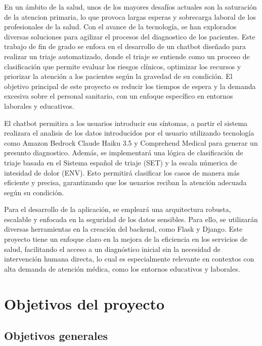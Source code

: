 
En un ámbito de la salud, unos de los mayores desafíos actuales son la saturación de la atencion primaria, lo que provoca largas esperas y sobrecarga laboral de los profesionales de la salud. Con el avance de la tecnología, se han explorados diversas soluciones para agilizar el procesos del diagnostico de los pacientes. Este trabajo de fin de grado se enfoca en el desarrollo de un chatbot diseñado para realizar un triaje automatizado, donde el triaje se entiende como un proceso de clasificación que permite evaluar los riesgos clínicos, optimizar los recursos y priorizar la atención a los pacientes según la gravedad de su condición. El objetivo principal de este proyecto es reducir los tiempos de espera y la demanda excesiva sobre el personal sanitario, con un enfoque específico en entornos laborales y educativos.

El chatbot permitira a los usuarios introducir sus síntomas, a partir el sistema realizara el analisis de los datos introducidos por el usuario utilizando tecnología como Amazon Bedrock Claude Haiku 3.5 y Comprehend Medical para generar un presunto diagnostico. Además, se implementará una lógica de clasificación de triaje basada en el Sistema español de triaje (SET) y la escala númerica de intesidad de dolor (ENV). Esto permitirá clasificar los casos de manera más eficiente y precisa, garantizando que los usuarios reciban la atención adecuada según su condición.

Para el desarrollo de la aplicación, se empleará una arquitectura robusta, escalable y enfocada en la seguridad de los datos sensibles. Para ello, se utilizarán diversas herramientas en la creación del backend, como Flask y Django. Este proyecto tiene un enfoque claro en la mejora de la eficiencia en los servicios de salud, facilitando el acceso a un diagnóstico inicial sin la necesidad de intervención humana directa, lo cual es especialmente relevante en contextos con alta demanda de atención médica, como los entornos educativos y laborales.

\section{Objetivos del proyecto}

\subsection{Objetivos generales}

